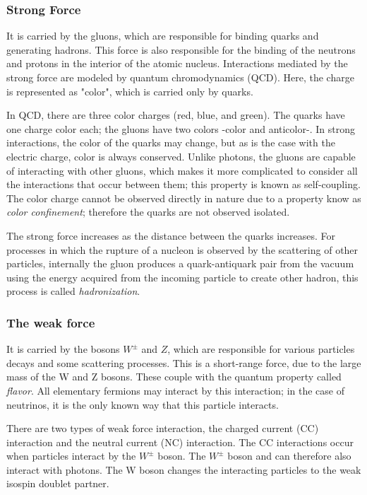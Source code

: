 \subsubsection{Strong Force}
It is carried by the gluons, which are responsible for binding quarks and generating hadrons. This force is also responsible for the binding of the neutrons and protons in the interior of the atomic nucleus. Interactions mediated by the strong force are modeled by quantum chromodynamics (QCD). Here, the charge is represented as "color", which is carried only by quarks.

In QCD, there are three color charges (red, blue, and green). The quarks have one charge color each;  the gluons have two colors -color and anticolor-. In strong interactions, the color of the quarks may change, but as is the case with the electric charge, color is always conserved. Unlike photons, the gluons are capable of interacting with other gluons, which makes it more complicated to consider all the interactions that occur between them; this property is known as self-coupling. The color charge cannot be observed directly in nature due to a property know as \textit{color confinement}; therefore the quarks are not observed isolated. 

The strong force increases as the distance between the quarks increases. For processes in which the rupture of a nucleon is observed by the scattering of other particles, internally the gluon produces a quark-antiquark pair from the vacuum using the energy acquired from the incoming particle to create other hadron, this process is called \textit{hadronization}.

 

\subsubsection{The weak force}
It is carried by the bosons $W^\pm$ and $Z$, which are responsible for various particles decays and some scattering processes. This is a short-range force, due to the large mass of the W and Z bosons. These couple with the quantum property called \textit{flavor}. All elementary fermions may interact by this interaction; in the case of neutrinos, it is the only known way that this particle interacts.

There are two types of weak force interaction, the charged current (CC) interaction and the neutral current (NC) interaction. The CC interactions occur when particles interact by the $W^\pm$ boson. The $W^\pm$ boson and can therefore also interact with photons. The W boson changes the interacting particles to the weak isospin doublet partner. 

